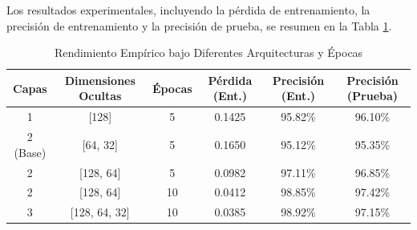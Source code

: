 \documentclass[12pt]{article}
\begin{document}
Los resultados experimentales, incluyendo la pérdida de entrenamiento, la precisión de entrenamiento y la precisión de prueba, se resumen en la Tabla \ref{tab:mnist_results}.

\begin{table}[h!]
\centering
\caption{Rendimiento Empírico bajo Diferentes Arquitecturas y Épocas}
\label{tab:mnist_results}
\begin{tabular}{cccccc}
\toprule
\textbf{Capas} & \textbf{Dimensiones Ocultas} & \textbf{Épocas} & \textbf{Pérdida (Ent.)} & \textbf{Precisión (Ent.)} & \textbf{Precisión (Prueba)} \\ \midrule
1 & [128] & 5 & 0.1425 & 95.82\% & 96.10\% \\ 
2 (Base) & [64, 32] & 5 & 0.1650 & 95.12\% & 95.35\% \\ 
2 & [128, 64] & 5 & 0.0982 & 97.11\% & 96.85\% \\ 
2 & [128, 64] & 10 & 0.0412 & 98.85\% & 97.42\% \\ 
3 & [128, 64, 32] & 10 & 0.0385 & 98.92\% & 97.15\% \\ \bottomrule
\end{tabular}
\end{table}
\end{document}
